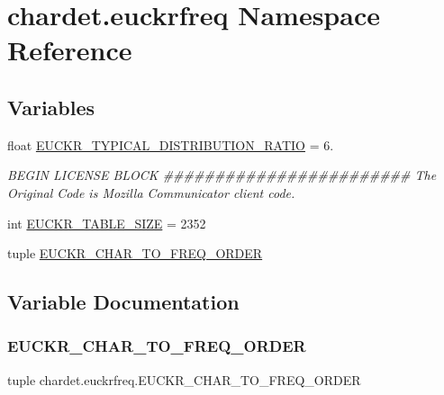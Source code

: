 \hypertarget{namespacechardet_1_1euckrfreq}{}\section{chardet.\+euckrfreq Namespace Reference}
\label{namespacechardet_1_1euckrfreq}
\subsection*{Variables}
\begin{DoxyCompactItemize}
\item 
float \hyperlink{namespacechardet_1_1euckrfreq_a00a8049ea23e6950d37142ab9a33bd08}{E\+U\+C\+K\+R\+\_\+\+T\+Y\+P\+I\+C\+A\+L\+\_\+\+D\+I\+S\+T\+R\+I\+B\+U\+T\+I\+O\+N\+\_\+\+R\+A\+T\+IO} = 6.
\begin{DoxyCompactList}\small\item\em B\+E\+G\+IN L\+I\+C\+E\+N\+SE B\+L\+O\+CK \#\#\#\#\#\#\#\#\#\#\#\#\#\#\#\#\#\#\#\#\#\#\#\# The Original Code is Mozilla Communicator client code. \end{DoxyCompactList}\item 
int \hyperlink{namespacechardet_1_1euckrfreq_a0194c5010cc8352bcdbe88faab0600f4}{E\+U\+C\+K\+R\+\_\+\+T\+A\+B\+L\+E\+\_\+\+S\+I\+ZE} = 2352
\item 
tuple \hyperlink{namespacechardet_1_1euckrfreq_af54eda056c622267a59fd796221f0b87}{E\+U\+C\+K\+R\+\_\+\+C\+H\+A\+R\+\_\+\+T\+O\+\_\+\+F\+R\+E\+Q\+\_\+\+O\+R\+D\+ER}
\end{DoxyCompactItemize}


\subsection{Variable Documentation}
\mbox{\label{namespacechardet_1_1euckrfreq_af54eda056c622267a59fd796221f0b87}} 
\subsubsection{\texorpdfstring{E\+U\+C\+K\+R\+\_\+\+C\+H\+A\+R\+\_\+\+T\+O\+\_\+\+F\+R\+E\+Q\+\_\+\+O\+R\+D\+ER}{EUCKR\_CHAR\_TO\_FREQ\_ORDER}}
{\footnotesize\ttfamily tuple chardet.\+euckrfreq.\+E\+U\+C\+K\+R\+\_\+\+C\+H\+A\+R\+\_\+\+T\+O\+\_\+\+F\+R\+E\+Q\+\_\+\+O\+R\+D\+ER}

